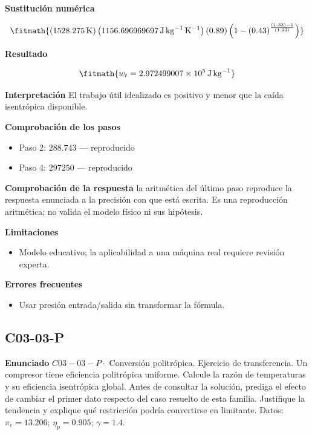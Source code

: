 \documentclass[10pt,openany]{book}
\begin{document}


\noindent\textbf{Sustitución numérica}

\[
\fitmath{\left(1528.275\,\mathrm{K}\right) \left(1156.696969697\,\mathrm{J}\,\mathrm{kg}^{-1}\,\mathrm{K}^{-1}\right) \left(0.89\right) \left(1 - \left(0.43\right)^{\frac{\left(1.33\right) - 1}{\left(1.33\right)}}\right)}
\]

\noindent\textbf{Resultado}

\[
\fitmath{w_t=2.972499007\times10^{5}\,\mathrm{J}\,\mathrm{kg}^{-1}}
\]

\noindent\textbf{Interpretación}
El trabajo útil idealizado es positivo y menor que la caída isentrópica disponible.

\noindent\textbf{Comprobación de los pasos}
\begin{itemize}
\item Paso 2: $288.743$ — reproducido
\item Paso 4: $297250$ — reproducido
\end{itemize}

\noindent\textbf{Comprobación de la respuesta} la aritmética del último paso reproduce la respuesta enunciada a la precisión con que está escrita. Es una reproducción aritmética; no valida el modelo físico ni sus hipótesis.

\noindent\textbf{Limitaciones}
\begin{itemize}
\item Modelo educativo; la aplicabilidad a una máquina real requiere revisión experta.
\end{itemize}

\noindent\textbf{Errores frecuentes}
\begin{itemize}
\item Usar presión entrada/salida sin transformar la fórmula.
\end{itemize}
\subsection*{C03-03-P}

\noindent\textbf{Enunciado}
\(C03-03-P \cdot\) Conversión politrópica. Ejercicio de transferencia. Un compresor tiene eficiencia politrópica uniforme. Calcule la razón de temperaturas y su eficiencia isentrópica global. Antes de consultar la solución, prediga el efecto de cambiar el primer dato respecto del caso resuelto de esta familia. Justifique la tendencia y explique qué restricción podría convertirse en limitante. Datos: \(\pi_c=13.206\); \(\eta_p=0.905\); \(\gamma=1.4\).
\end{document}

